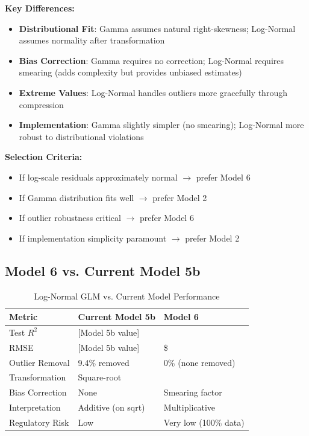 \textbf{Key Differences:}

\begin{itemize}
    \item \textbf{Distributional Fit}: Gamma assumes natural right-skewness; Log-Normal assumes normality after transformation
    \item \textbf{Bias Correction}: Gamma requires no correction; Log-Normal requires smearing (adds complexity but provides unbiased estimates)
    \item \textbf{Extreme Values}: Log-Normal handles outliers more gracefully through compression
    \item \textbf{Implementation}: Gamma slightly simpler (no smearing); Log-Normal more robust to distributional violations
\end{itemize}

\textbf{Selection Criteria:}
\begin{itemize}
    \item If log-scale residuals approximately normal $\rightarrow$ prefer Model 6
    \item If Gamma distribution fits well $\rightarrow$ prefer Model 2
    \item If outlier robustness critical $\rightarrow$ prefer Model 6
    \item If implementation simplicity paramount $\rightarrow$ prefer Model 2
\end{itemize}

\subsection{Model 6 vs. Current Model 5b}

\begin{table}[h]
\centering
\caption{Log-Normal GLM vs. Current Model Performance}
\begin{tabular}{lll}
\toprule
\textbf{Metric} & \textbf{Current Model 5b} & \textbf{Model 6} \\
\midrule
Test $R^2$ & [Model 5b value] & \ModelSixRSquaredTest{} \\
RMSE & [Model 5b value] & \$\ModelSixRMSETest{} \\
Outlier Removal & 9.4\% removed & 0\% (none removed) \\
Transformation & Square-root & \ModelSixTransformation{} \\
Bias Correction & None & Smearing factor \\
Interpretation & Additive (on sqrt) & Multiplicative \\
Regulatory Risk & Low & Very low (100\% data) \\
\bottomrule
\end{tabular}
\end{table}

